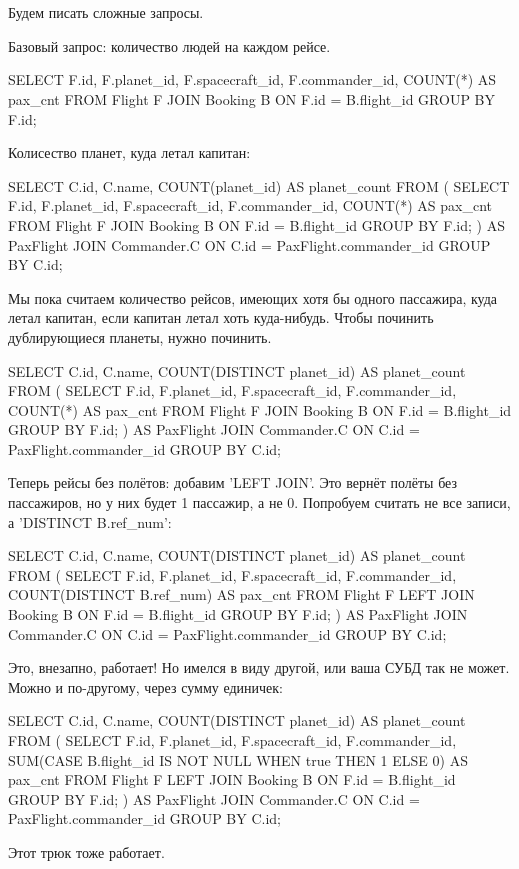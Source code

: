 \chapter{}

Будем писать сложные запросы.

Базовый запрос: количество людей на каждом рейсе.
\begin{sqlcode}
SELECT
	F.id, F.planet_id, F.spacecraft_id, F.commander_id, COUNT(*) AS pax_cnt
	FROM Flight F JOIN Booking B ON F.id = B.flight_id
	GROUP BY F.id;
\end{sqlcode}

Колисество планет, куда летал капитан:
\begin{sqlcode}
SELECT
	C.id, C.name, COUNT(planet_id) AS planet_count
	FROM (
		SELECT
			F.id, F.planet_id, F.spacecraft_id, F.commander_id, COUNT(*) AS pax_cnt
			FROM Flight F JOIN Booking B ON F.id = B.flight_id
			GROUP BY F.id;
	) AS PaxFlight
	JOIN Commander.C ON C.id = PaxFlight.commander_id
	GROUP BY C.id;
\end{sqlcode}
Мы пока считаем количество рейсов, имеющих хотя бы одного пассажира, куда летал капитан, если капитан летал хоть куда-нибудь.
Чтобы починить дублирующиеся планеты, нужно починить.
\begin{sqlcode}
SELECT
	C.id, C.name, COUNT(DISTINCT planet_id) AS planet_count
	FROM (
		SELECT
			F.id, F.planet_id, F.spacecraft_id, F.commander_id, COUNT(*) AS pax_cnt
			FROM Flight F JOIN Booking B ON F.id = B.flight_id
			GROUP BY F.id;
	) AS PaxFlight
	JOIN Commander.C ON C.id = PaxFlight.commander_id
	GROUP BY C.id;
\end{sqlcode}
Теперь рейсы без полётов: добавим \sql'LEFT JOIN'. Это вернёт полёты без пассажиров, но у них будет 1 пассажир, а не 0.
Попробуем считать не все записи, а \sql'DISTINCT B.ref_num':
\begin{sqlcode}
SELECT
	C.id, C.name, COUNT(DISTINCT planet_id) AS planet_count
	FROM (
		SELECT
			F.id, F.planet_id, F.spacecraft_id, F.commander_id, COUNT(DISTINCT B.ref_num) AS pax_cnt
			FROM Flight F LEFT JOIN Booking B ON F.id = B.flight_id
			GROUP BY F.id;
	) AS PaxFlight
	JOIN Commander.C ON C.id = PaxFlight.commander_id
	GROUP BY C.id;
\end{sqlcode}
Это, внезапно, работает! Но имелся в виду другой, или ваша СУБД так не может.
Можно и по-другому, через сумму единичек:
\begin{sqlcode}
SELECT
	C.id, C.name, COUNT(DISTINCT planet_id) AS planet_count
	FROM (
		SELECT
			F.id, F.planet_id, F.spacecraft_id, F.commander_id,
			SUM(CASE B.flight_id IS NOT NULL WHEN true THEN 1 ELSE 0) AS pax_cnt
			FROM Flight F LEFT JOIN Booking B ON F.id = B.flight_id
			GROUP BY F.id;
	) AS PaxFlight
	JOIN Commander.C ON C.id = PaxFlight.commander_id
	GROUP BY C.id;
\end{sqlcode}
Этот трюк тоже работает.

